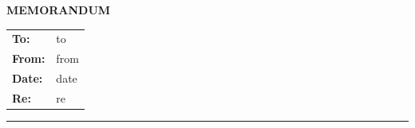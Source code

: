 \begin{center}\textbf{\large MEMORANDUM}\end{center}

\begin{tabular}{@{}ll@{}}
\textbf{To:}   & {{to}} \\
\textbf{From:} & {{from}} \\
\textbf{Date:} & {{date}} \\
\textbf{Re:}   & {{re}} \\
\end{tabular}

\noindent\rule{\textwidth}{0.4pt}
